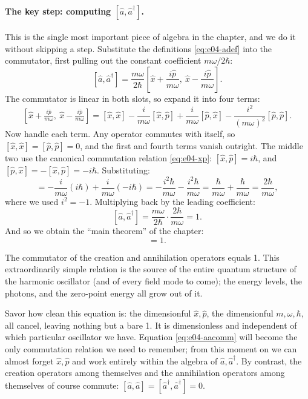 \paragraph{The key step: computing \([\hat a,\hat a^\dagger]\).}
This is the single most important piece of algebra in the chapter, and we do it without skipping a step. Substitute the definitions \eqref{eq:e04-adef} into the commutator, first pulling out the constant coefficient \(m\omega/2\hbar\):
\[
  [\hat a,\hat a^\dagger]
  =\frac{m\omega}{2\hbar}
  \left[\hat x+\frac{i\hat p}{m\omega},\ \hat x-\frac{i\hat p}{m\omega}\right].
\]
The commutator is linear in both slots, so expand it into four terms:
\[
  \left[\hat x+\tfrac{i\hat p}{m\omega},\ \hat x-\tfrac{i\hat p}{m\omega}\right]
  =[\hat x,\hat x]
  -\frac{i}{m\omega}[\hat x,\hat p]
  +\frac{i}{m\omega}[\hat p,\hat x]
  -\frac{i^2}{(m\omega)^2}[\hat p,\hat p].
\]
Now handle each term. Any operator commutes with itself, so \([\hat x,\hat x]=[\hat p,\hat p]=0\), and the first and fourth terms vanish outright. The middle two use the canonical commutation relation \eqref{eq:e04-xp}: \([\hat x,\hat p]=i\hbar\), and \([\hat p,\hat x]=-[\hat x,\hat p]=-i\hbar\). Substituting:
\[
  =-\frac{i}{m\omega}(i\hbar)+\frac{i}{m\omega}(-i\hbar)
  =-\frac{i^2\hbar}{m\omega}-\frac{i^2\hbar}{m\omega}
  =\frac{\hbar}{m\omega}+\frac{\hbar}{m\omega}
  =\frac{2\hbar}{m\omega},
\]
where we used \(i^2=-1\). Multiplying back by the leading coefficient:
\[
  [\hat a,\hat a^\dagger]=\frac{m\omega}{2\hbar}\cdot\frac{2\hbar}{m\omega}=1.
\]
And so we obtain the ``main theorem'' of the chapter:
\begin{equation}
  [\hat a,\hat a^\dagger]=1 .
  \label{eq:e04-aacomm}
\end{equation}
\begin{formulaexplain}
The commutator of the creation and annihilation operators equals 1. This extraordinarily simple relation is the source of the entire quantum structure of the harmonic oscillator (and of every field mode to come); the energy levels, the photons, and the zero-point energy all grow out of it.
\end{formulaexplain}
Savor how clean this equation is: the dimensionful \(\hat x,\hat p\), the dimensionful \(m,\omega,\hbar\), all cancel, leaving nothing but a bare 1. It is dimensionless and independent of which particular oscillator we have. Equation \eqref{eq:e04-aacomm} will become the only commutation relation we need to remember; from this moment on we can almost forget \(\hat x,\hat p\) and work entirely within the algebra of \(\hat a,\hat a^\dagger\). By contrast, the creation operators among themselves and the annihilation operators among themselves of course commute: \([\hat a,\hat a]=[\hat a^\dagger,\hat a^\dagger]=0\).

